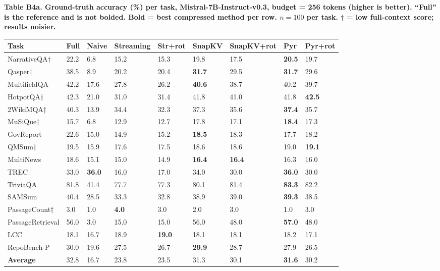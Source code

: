 \documentclass[10pt,letterpaper]{article}
\begin{document}
\textbf{Table B4a. Ground-truth accuracy (\%) per task, Mistral-7B-Instruct-v0.3,
budget = 256 tokens (higher is better). ``Full'' is the reference and is not bolded.
Bold = best compressed method per row.
$n = 100$ per task. \(\dagger\) = low full-context score; results noisier.}

\begin{table}[H]
\centering
\small
\begin{tabular}{@{}lllllllll@{}}
\toprule
Task & Full & Naive & Streaming & Str+rot & SnapKV & SnapKV+rot & Pyr &
Pyr+rot\\
\midrule
NarrativeQA† & 22.2 & 6.8 & 15.2 & 15.3 & 19.8 & 17.5 & \textbf{20.5} &
19.7\\
Qasper† & 38.5 & 8.9 & 20.2 & 20.4 & \textbf{31.7} & 29.5 & \textbf{31.7} &
29.6\\
MultifieldQA & 42.2 & 17.6 & 27.8 & 26.2 & \textbf{40.6} & 38.7 & 40.2 &
39.7\\
HotpotQA† & 42.3 & 21.0 & 31.0 & 31.4 & 41.8 & 41.0 & 41.8 &
\textbf{42.5}\\
2WikiMQA† & 40.3 & 13.9 & 34.4 & 32.3 & 37.3 & 35.6 & \textbf{37.4} &
35.7\\
MuSiQue† & 15.7 & 6.8 & 12.9 & 12.7 & 17.8 & 17.1 & \textbf{18.4} &
17.3\\
GovReport & 22.6 & 15.0 & 14.9 & 15.2 & \textbf{18.5} & 18.3 & 17.7 &
18.2\\
QMSum† & 19.5 & 15.9 & 17.6 & 17.5 & 18.6 & 18.6 & 19.0 &
\textbf{19.1}\\
MultiNews & 18.6 & 15.1 & 15.0 & 14.9 & \textbf{16.4} & \textbf{16.4} & 16.3 &
16.0\\
TREC & 33.0 & \textbf{36.0} & 16.0 & 17.0 & 34.0 & 30.0 & \textbf{36.0} &
30.0\\
TriviaQA & 81.8 & 41.4 & 77.7 & 77.3 & 80.1 & 81.4 & \textbf{83.3} &
82.2\\
SAMSum & 40.4 & 28.5 & 33.3 & 32.8 & 38.9 & 39.0 & \textbf{39.3} &
38.5\\
PassageCount† & 3.0 & 1.0 & \textbf{4.0} & 3.0 & 2.0 & 3.0 & 1.0 &
3.0\\
PassageRetrieval & 56.0 & 3.0 & 15.0 & 15.0 & 56.0 & 48.0 & \textbf{57.0} &
48.0\\
LCC & 18.1 & 16.7 & 18.9 & \textbf{19.0} & 18.1 & 18.1 & 18.2 &
17.1\\
RepoBench-P & 30.0 & 19.6 & 27.5 & 26.7 & \textbf{29.9} & 28.7 & 27.9 &
26.5\\
\textbf{Average} & 32.8 & 16.7 & 23.8 & 23.5 & 31.3 & 30.1 & \textbf{31.6} &
30.2\\
\bottomrule
\end{tabular}
\end{table}
\end{document}
